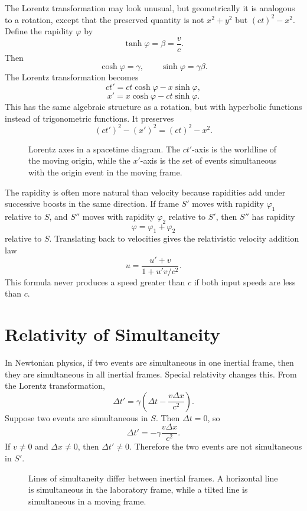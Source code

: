 The Lorentz transformation may look unusual, but geometrically it is analogous
to a rotation, except that the preserved quantity is not \(x^2+y^2\) but
\((ct)^2-x^2\). Define the rapidity \(\varphi\) by
\[
\tanh\varphi=\beta=\frac{v}{c}.
\]
Then
\[
\cosh\varphi=\gamma,
\qquad
\sinh\varphi=\gamma\beta.
\]
The Lorentz transformation becomes
\[
ct'=ct\cosh\varphi-x\sinh\varphi,
\]
\[
x'=x\cosh\varphi-ct\sinh\varphi.
\]
This has the same algebraic structure as a rotation, but with hyperbolic
functions instead of trigonometric functions. It preserves
\[
(ct')^2-(x')^2=(ct)^2-x^2.
\]

\begin{figure}[h]
\centering

\caption{Lorentz axes in a spacetime diagram. The \(ct'\)-axis is the worldline
of the moving origin, while the \(x'\)-axis is the set of events simultaneous
with the origin event in the moving frame.}
\end{figure}

The rapidity is often more natural than velocity because rapidities add under
successive boosts in the same direction. If frame \(S'\) moves with rapidity
\(\varphi_1\) relative to \(S\), and \(S''\) moves with rapidity \(\varphi_2\)
relative to \(S'\), then \(S''\) has rapidity
\[
\varphi=\varphi_1+\varphi_2
\]
relative to \(S\). Translating back to velocities gives the relativistic
velocity addition law
\[
u=\frac{u'+v}{1+u'v/c^2}.
\]
This formula never produces a speed greater than \(c\) if both input speeds are
less than \(c\).

\clearpage

\section{Relativity of Simultaneity}

In Newtonian physics, if two events are simultaneous in one inertial frame, then
they are simultaneous in all inertial frames. Special relativity changes this.
From the Lorentz transformation,
\[
\Delta t'=\gamma\left(\Delta t-\frac{v\Delta x}{c^2}\right).
\]
Suppose two events are simultaneous in \(S\). Then \(\Delta t=0\), so
\[
\Delta t'=-\gamma\frac{v\Delta x}{c^2}.
\]
If \(v\neq 0\) and \(\Delta x\neq 0\), then \(\Delta t'\neq 0\). Therefore the
two events are not simultaneous in \(S'\).

\begin{figure}[h]
\centering

\caption{Lines of simultaneity differ between inertial frames. A horizontal line
is simultaneous in the laboratory frame, while a tilted line is simultaneous in
a moving frame.}
\end{figure}

